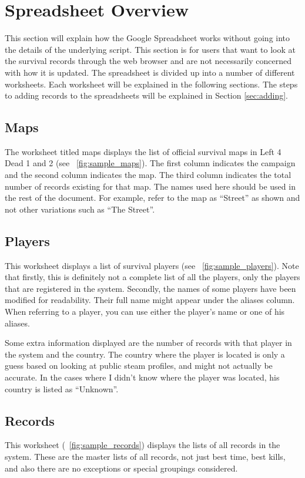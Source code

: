 \section{Spreadsheet Overview}
This section will explain how the Google Spreadsheet works without going into the details of the underlying script. This section is for users that want to look at the survival records through the web browser and are not necessarily concerned with how it is updated. The spreadsheet is divided up into a number of different worksheets. Each worksheet will be explained in the following sections. The steps to adding records to the spreadsheets will be explained in Section \ref{sec:adding}.

\subsection{Maps}
The worksheet titled maps displays the list of official survival maps in Left 4 Dead 1 and 2 (see \figurename\ \ref{fig:sample_maps}). The first column indicates the campaign and the second column indicates the map. The third column indicates the total number of records existing for that map. The names used here should be used in the rest of the document. For example, refer to the map as ``Street'' as shown and not other variations such as ``The Street''.

\subsection{Players}
This worksheet displays a list of survival players (see \figurename\ \ref{fig:sample_players}). Note that firstly, this is definitely not a complete list of all the players, only the players that are registered in the system. Secondly, the names of some players have been modified for readability. Their full name might appear under the aliases column. When referring to a player, you can use either the player's name or one of his aliases.

Some extra information displayed are the number of records with that player in the system and the country. The country where the player is located is only a guess based on looking at public steam profiles, and might not actually be accurate. In the cases where I didn't know where the player was located, his country is listed as ``Unknown''.

\subsection{Records}
This worksheet (\figurename\ \ref{fig:sample_records}) displays the lists of all records in the system. These are the master lists of all records, not just best time, best kills, and also there are no exceptions or special groupings considered.

